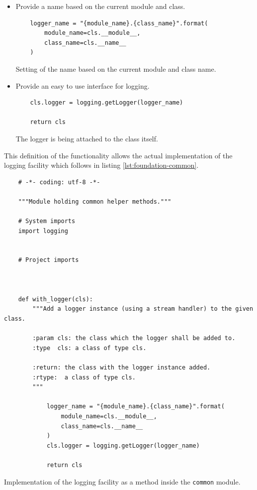 \documentclass[10pt, openright, notitlepage]{scrreprt}
\begin{document}
\begin{itemize}
\item Provide a name based on the current module and class.
\begin{listing}[H]
\begin{verbatim}
    logger_name = "{module_name}.{class_name}".format(
        module_name=cls.__module__,
        class_name=cls.__name__
    )
\end{verbatim}
\caption{\label{logger-name}
Setting of the name based on the current module and class name.}
\end{listing}
\item Provide an easy to use interface for logging.
\begin{listing}[H]
\begin{verbatim}
    cls.logger = logging.getLogger(logger_name)
    
    return cls
\end{verbatim}
\caption{\label{logger-return-logger}
The logger is being attached to the class itself.}
\end{listing}
\end{itemize}

This definition of the functionality allows the actual implementation of the
logging facility which follows in listing \ref{lst:foundation-common}.

\begin{listing}[H]
\begin{verbatim}
    # -*- coding: utf-8 -*-
    
    """Module holding common helper methods."""
    
    # System imports
    import logging
    
    
    # Project imports
    
    
    
    def with_logger(cls):
        """Add a logger instance (using a stream handler) to the given class.
    
        :param cls: the class which the logger shall be added to.
        :type  cls: a class of type cls.
    
        :return: the class with the logger instance added.
        :rtype:  a class of type cls.
        """
    
            logger_name = "{module_name}.{class_name}".format(
                module_name=cls.__module__,
                class_name=cls.__name__
            )
            cls.logger = logging.getLogger(logger_name)
            
            return cls
\end{verbatim}
\caption{\label{lst:foundation-common}
Implementation of the logging facility as a method inside the \texttt{common}  module.}
\end{listing}
\end{document}
